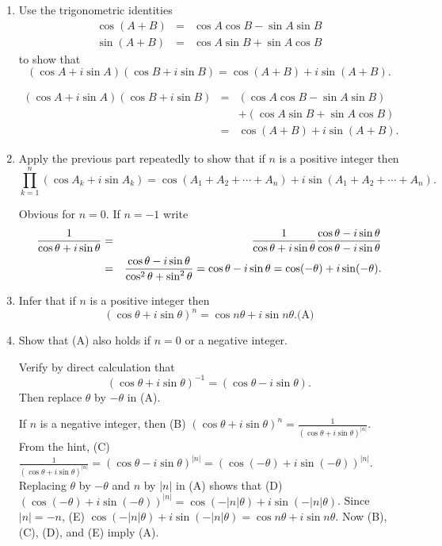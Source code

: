 \documentclass{ximera}
\begin{document}
\begin{problem}\label{exer:9.2.42}
\begin{enumerate}
\item %
Use the trigonometric identities
\begin{eqnarray*}
\cos(A+B)&=&\cos A\cos B-\sin A\sin B\\
\sin(A+B)&=&\cos A\sin B+\sin A\cos B
\end{eqnarray*}
to show that
$$
(\cos A+i\sin A)(\cos B+i\sin B)=\cos(A+B)+i\sin(A+B).
$$

\begin{solution}
\begin{eqnarray*}
(\cos A+i\sin A)(\cos B+i\sin B)&=&(\cos A\cos B-\sin A\sin B)
\\&&+(\cos A\sin B+\sin A\cos B)\\
&=&\cos(A+B)+i\sin(A+B).
\end{eqnarray*}
\end{solution}

\item %
Apply the previous part repeatedly to show that if $n$ is a positive
integer then
$$
\prod_{k=1}^n(\cos A_k+i\sin A_k)=\cos(A_1+A_2+\cdots+A_n)
+i\sin(A_1+A_2+\cdots+A_n).
$$

\begin{solution}
Obvious for $n=0$. If $n=-1$ write
\begin{eqnarray*}
{1\over\cos\theta+i\sin\theta}&=&{1\over\cos\theta+i\sin\theta}
{\cos\theta-i\sin\theta\over\cos\theta-i\sin\theta}\\
&=&{\cos\theta-i\sin\theta\over\cos^2\theta+\sin^2\theta}=
\cos\theta-i\sin\theta=\cos(-\theta)+i\sin(-\theta).
\end{eqnarray*}
\end{solution}

\item %
Infer that if $n$ is a positive integer then
$$
(\cos\theta+i\sin\theta)^n=\cos n\theta+i\sin n\theta.
\text{(A)}
$$

\item %
Show that (A) also holds if $n=0$ or a negative integer.
\begin{hint}
Verify by direct calculation that
$$
(\cos\theta+i\sin\theta)^{-1}=(\cos\theta-i\sin\theta).
$$
Then replace $\theta$ by $-\theta$  in (A).
\end{hint}

\begin{solution}
If $n$ is a negative integer, then
(B)
$(\cos\theta+i\sin\theta)^n=\frac{1}{(\cos\theta+i\sin\theta)^{|n|}}$.
From the hint,
(C)
$\frac{1}{(\cos\theta+i\sin\theta)^{|n|}}=(\cos\theta-i\sin\theta)^{|n|}
=(\cos(-\theta)+i\sin(-\theta))^{|n|}$.
Replacing $\theta$ by $-\theta$ and $n$ by $|n|$ in (A) shows that
(D)
$(\cos(-\theta)+i\sin(-\theta))^{|n|}=\cos(-|n|\theta)+i\sin(-|n|\theta)$.
Since $|n|=-n$, (E)
$\cos(-|n|\theta)+i\sin(-|n|\theta)=\cos n\theta+i\sin n\theta$. Now
(B), (C), (D), and (E) imply (A).
\end{solution}


\end{enumerate}
\end{problem}
\end{document}

